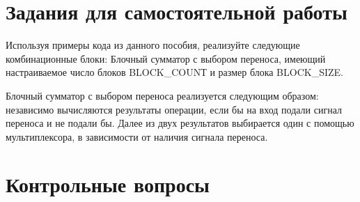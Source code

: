 \documentclass[a4paper,14pt]{article}
\begin{document}
	\section{Задания для самостоятельной работы}
	
	Используя примеры кода из данного пособия, реализуйте следующие комбинационные
	блоки:
	Блочный сумматор с выбором переноса, имеющий настраиваемое число блоков
	BLOCK\_COUNТ и размер блока BLOCK\_SIZE.
	
	
	Блочный сумматор с выбором переноса реализуется следующим образом:
	независимо вычисляются результаты операции, если бы на вход подали сигнал переноса и не подали бы.
	Далее из двух результатов выбирается один с помощью мультиплексора, в зависимости от наличия сигнала переноса.
	
	
	
	\section{Контрольные вопросы}
	
\end{document}
